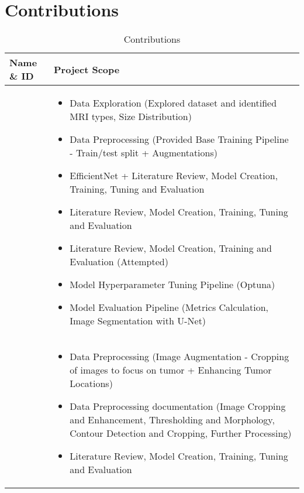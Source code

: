 \section{Contributions}\label{contribution}


\begin{longtable}{p{5cm}|p{9.5cm}}
  \caption{Contributions}
  \label{tab:contributions}
    \hline
    \textbf{Name} \& \textbf{ID} & \textbf{Project Scope}\\
    \hline

    \nameref{ss:wjw} &
        \begin{itemize}
            \item Data Exploration (Explored dataset and identified MRI types, Size Distribution)
            \item Data Preprocessing (Provided Base Training Pipeline - Train/test split + Augmentations)
            \item EfficientNet + \nameref{s:unet} Literature Review, Model Creation, Training, Tuning and Evaluation
            \item \nameref{s:inceptionv3} Literature Review, Model Creation, Training, Tuning and Evaluation
            \item \nameref{ss:vgg16} Literature Review, Model Creation, Training and Evaluation (Attempted)
            \item Model Hyperparameter Tuning Pipeline (Optuna)
            \item Model Evaluation Pipeline (Metrics Calculation, Image Segmentation with U-Net)
        \end{itemize}\\
        \hline

    \nameref{ss:blch} &
        \begin{itemize}
            \item Data Preprocessing (Image Augmentation - Cropping of images to focus on tumor + Enhancing Tumor Locations)
            \item Data Preprocessing documentation (Image Cropping and Enhancement, Thresholding and Morphology, Contour Detection and Cropping, Further Processing)
            \item \nameref{s:resnet50} Literature Review, Model Creation, Training, Tuning and Evaluation
        \end{itemize}\\
        \hline


\end{longtable}
